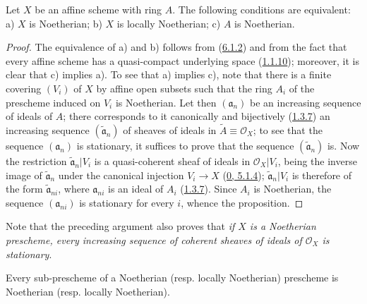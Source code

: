 \begin{proposition}[6.1.3]
\label{I.6.1.3}
Let $X$ be an affine scheme with ring $A$. The following conditions are
equivalent: a) $X$ is Noetherian; b) $X$ is locally Noetherian;
c) $A$ is Noetherian.
\end{proposition}

\begin{proof}
The equivalence of a) and b) follows from (\hyperref[I.6.1.2]{6.1.2}) and
from the fact that every affine scheme has a quasi-compact underlying space
(\hyperref[I.1.1.10]{1.1.10}); moreover, it is clear that c) implies a).
To see that a) implies c), note that there is a finite covering
$(V_i)$ of $X$ by affine open subsets such that the ring $A_i$ of the
prescheme induced on $V_i$ is Noetherian. Let then $(\mathfrak{a}_n)$ be an
increasing sequence of ideals of $A$; there corresponds to it canonically and
bijectively (\hyperref[I.1.3.7]{1.3.7}) an increasing sequence
$(\widetilde{\mathfrak{a}}_n)$ of sheaves of ideals in
$\widetilde{A}\equiv\mathscr{O}_X$; to see that the sequence
$(\mathfrak{a}_n)$ is stationary, it suffices to prove that the sequence
$(\widetilde{\mathfrak{a}}_n)$ is. Now the restriction
$\widetilde{\mathfrak{a}}_n|V_i$ is a quasi-coherent sheaf of ideals in
$\mathscr{O}_X|V_i$, being the inverse image of
$\widetilde{\mathfrak{a}}_n$ under the canonical injection $V_i\to X$
(\hyperref[0.5.1.4]{0, 5.1.4}); $\widetilde{\mathfrak{a}}_n|V_i$ is
therefore of the form $\widetilde{\mathfrak{a}}_{ni}$, where $\mathfrak{a}_{ni}$
is an ideal of $A_i$ (\hyperref[I.1.3.7]{1.3.7}). Since $A_i$ is
Noetherian, the sequence $(\mathfrak{a}_{ni})$ is stationary for every $i$,
whence the proposition.
\end{proof}

Note that the preceding argument also proves that \emph{if $X$ is a
Noetherian prescheme, every increasing sequence of coherent sheaves of ideals
of $\mathscr{O}_X$ is stationary}.

\begin{proposition}[6.1.4]
\label{I.6.1.4}
Every sub-prescheme of a Noetherian (resp. locally Noetherian) prescheme
is Noetherian (resp. locally Noetherian).
\end{proposition}


